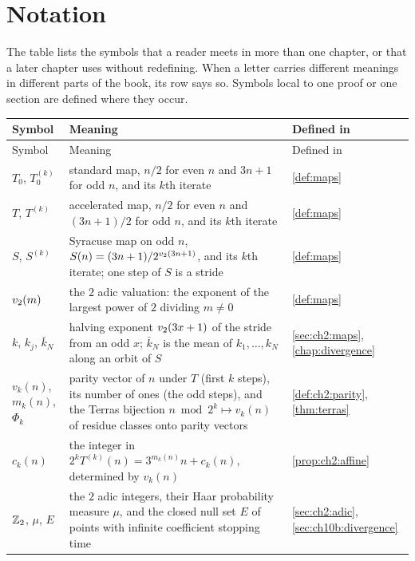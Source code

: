 \chapter*{Notation}

The table lists the symbols that a reader meets in more than one chapter, or that a later chapter uses without redefining. When a letter carries different meanings in different parts of the book, its row says so. Symbols local to one proof or one section are defined where they occur.

\begingroup
\linespread{1}\footnotesize
\setlength{\tabcolsep}{4pt}
\begin{longtable}{@{}>{\raggedright\arraybackslash}p{0.95in}>{\raggedright\arraybackslash}p{3.3in}>{\raggedright\arraybackslash}p{1.0in}@{}}
\toprule
Symbol & Meaning & Defined in \\
\midrule
\endfirsthead
\toprule
Symbol & Meaning & Defined in \\
\midrule
\endhead
\bottomrule
\endfoot
$T_0$, $T_0^{(k)}$ & standard map, $n/2$ for even $n$ and $3n+1$ for odd $n$, and its $k$th iterate & \cref{def:maps} \\
$T$, $T^{(k)}$ & accelerated map, $n/2$ for even $n$ and $(3n+1)/2$ for odd $n$, and its $k$th iterate & \cref{def:maps} \\
$S$, $S^{(k)}$ & Syracuse map on odd $n$, $S(n)=(3n+1)/2^{v_2(3n+1)}$, and its $k$th iterate; one step of $S$ is a stride & \cref{def:maps} \\
$v_2(m)$ & the $2$ adic valuation: the exponent of the largest power of $2$ dividing $m\neq0$ & \cref{def:maps} \\
$k$, $k_j$, $\bar k_N$ & halving exponent $v_2(3x+1)$ of the stride from an odd $x$; $\bar k_N$ is the mean of $k_1,\dots,k_N$ along an orbit of $S$ & \cref{sec:ch2:maps}, \cref{chap:divergence} \\
$v_k(n)$, $m_k(n)$, $\Phi_k$ & parity vector of $n$ under $T$ (first $k$ steps), its number of ones (the odd steps), and the Terras bijection $n\bmod2^k\mapsto v_k(n)$ of residue classes onto parity vectors & \cref{def:ch2:parity}, \cref{thm:terras} \\
$c_k(n)$ & the integer in $2^kT^{(k)}(n)=3^{m_k(n)}n+c_k(n)$, determined by $v_k(n)$ & \cref{prop:ch2:affine} \\
$\mathbb{Z}_2$, $\mu$, $E$ & the $2$ adic integers, their Haar probability measure $\mu$, and the closed null set $E$ of points with infinite coefficient stopping time & \cref{sec:ch2:adic}, \cref{sec:ch10b:divergence} \\

\end{longtable}
